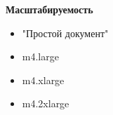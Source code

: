 \documentclass[usenames,dvipsnames, 18pt, compress, aspectratio=169]{beamer}
\begin{document}
%
\begin{frame}
    \frametitle{}
\end{frame}


\begin{frame}
    \frametitle{}
    \begin{center}
        \textbf{Масштабируемость}
        \begin{itemize}[label={}]
            \item "Простой документ"
            \item m4.large
            \item m4.xlarge
            \item m4.2xlarge
        \end{itemize}
    \end{center}
\end{frame}
\end{document}
